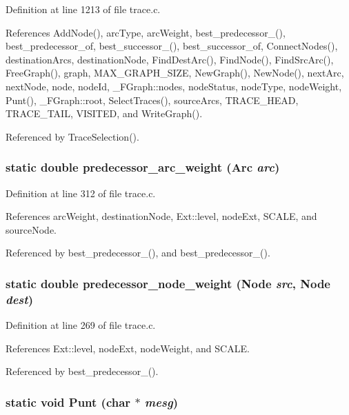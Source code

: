Definition at line 1213 of file trace.c.

References Add\-Node(), arc\-Type, arc\-Weight, best\_\-predecessor\_(), best\_\-predecessor\_\-of, best\_\-successor\_(), best\_\-successor\_\-of, Connect\-Nodes(), destination\-Arcs, destination\-Node, Find\-Dest\-Arc(), Find\-Node(), Find\-Src\-Arc(), Free\-Graph(), graph, MAX\_\-GRAPH\_\-SIZE, New\-Graph(), New\-Node(), next\-Arc, next\-Node, node, node\-Id, \_\-FGraph::nodes, node\-Status, node\-Type, node\-Weight, Punt(), \_\-FGraph::root, Select\-Traces(), source\-Arcs, TRACE\_\-HEAD, TRACE\_\-TAIL, VISITED, and Write\-Graph().

Referenced by Trace\-Selection().
\subsubsection{\setlength{\rightskip}{0pt plus 5cm}static double predecessor\_\-arc\_\-weight (\bf{Arc} {\em arc})\hspace{0.3cm}{\tt  [static]}}\label{trace_8c_e68dfdfe3eae73e6436aa193b4a204ac}




Definition at line 312 of file trace.c.

References arc\-Weight, destination\-Node, Ext::level, node\-Ext, SCALE, and source\-Node.

Referenced by best\_\-predecessor\_(), and best\_\-predecessor\_().
\subsubsection{\setlength{\rightskip}{0pt plus 5cm}static double predecessor\_\-node\_\-weight (\bf{Node} {\em src}, \bf{Node} {\em dest})\hspace{0.3cm}{\tt  [static]}}\label{trace_8c_bcc377d07297befb3d8731bcc51fc341}




Definition at line 269 of file trace.c.

References Ext::level, node\-Ext, node\-Weight, and SCALE.

Referenced by best\_\-predecessor\_().
\subsubsection{\setlength{\rightskip}{0pt plus 5cm}static void Punt (char $\ast$ {\em mesg})\hspace{0.3cm}{\tt  [static]}}\label{trace_8c_5e4a7703cc8669ffef811a7f4a99562f}




